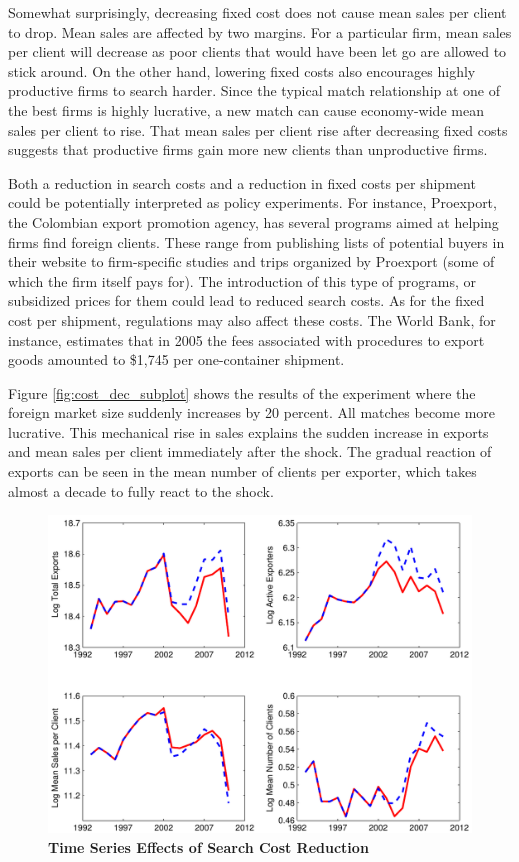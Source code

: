 \documentclass[12pt,titlepage]{article}
\begin{document}
Somewhat surprisingly, decreasing fixed cost does not cause mean sales per
client to drop. Mean sales are affected by two margins. For a particular
firm, mean sales per client will decrease as poor clients that would have
been let go are allowed to stick around. On the other hand, lowering fixed
costs also encourages highly productive firms to search harder. Since the
typical match relationship at one of the best firms is highly lucrative, a
new match can cause economy-wide mean sales per client to rise. That mean
sales per client rise after decreasing fixed costs suggests that productive
firms gain more new clients than unproductive firms.

Both a reduction in search costs and a reduction in fixed costs per shipment
could be potentially interpreted as policy experiments. For instance,
Proexport, the Colombian export promotion agency, has several programs aimed
at helping firms find foreign clients. These range from publishing lists of
potential buyers in their website to firm-specific studies and trips
organized by Proexport (some of which the firm itself pays for). The
introduction of this type of programs, or subsidized prices for them could
lead to reduced search costs. As for the fixed cost per shipment,
regulations may also affect these costs. The World Bank, for instance,
estimates that in 2005 the fees associated with procedures to export goods
amounted to \$1,745 per one-container shipment.

Figure \ref{fig:cost_dec_subplot} shows the results of the experiment where
the foreign market size suddenly increases by 20 percent. All matches become
more lucrative. This mechanical rise in sales explains the sudden increase
in exports and mean sales per client immediately after the shock. The
gradual reaction of exports can be seen in the mean number of clients per
exporter, which takes almost a decade to fully react to the shock.

\pagebreak

\begin{figure}[tbp]
\centering\includegraphics[width=\textwidth]{figures/figure3-eps-converted-to.pdf}
\caption{\textbf{Time Series Effects of Search Cost Reduction}}
\label{fig:search_dec_subplot}
\end{figure}
\newpage
\end{document}
